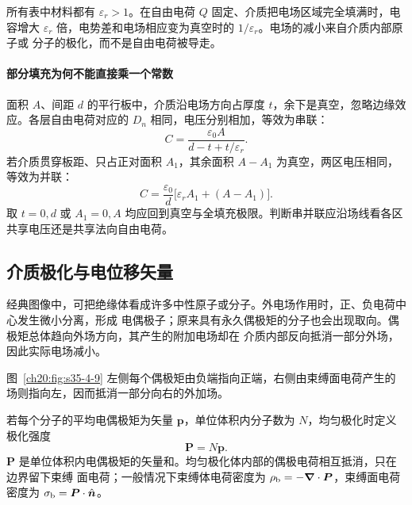 {所有表中材料都有 $\varepsilon_r>1$。在自由电荷 $Q$ 固定、介质把电场区域完全填满时，电容增大
$\varepsilon_r$ 倍，电势差和电场相应变为真空时的 $1/\varepsilon_r$。电场的减小来自介质内部原子或
分子的极化，而不是自由电荷被导走。


\paragraph{部分填充为何不能直接乘一个常数}
面积 $A$、间距 $d$ 的平行板中，介质沿电场方向占厚度 $t$，余下是真空，忽略边缘效应。各层自由电荷对应的 $D_n$ 相同，电压分别相加，等效为串联：
\[
 C=\frac{\varepsilon_0A}{d-t+t/\varepsilon_r}.
\]
若介质贯穿板距、只占正对面积 $A_1$，其余面积 $A-A_1$ 为真空，两区电压相同，等效为并联：
\[
 C=\frac{\varepsilon_0}{d}\bigl[\varepsilon_rA_1+(A-A_1)\bigr].
\]
取 $t=0,d$ 或 $A_1=0,A$ 均应回到真空与全填充极限。判断串并联应沿场线看各区共享电压还是共享法向自由电荷。


\subsection{介质极化与电位移矢量}


经典图像中，可把绝缘体看成许多中性原子或分子。外电场作用时，正、负电荷中心发生微小分离，形成
电偶极子；原来具有永久偶极矩的分子也会出现取向。偶极矩总体趋向外场方向，其产生的附加电场却在
介质内部反向抵消一部分外场，因此实际电场减小。

图~\ref{ch20:fig:s35-4-9} 左侧每个偶极矩由负端指向正端，右侧由束缚面电荷产生的场则指向左，因而抵消一部分向右的外加场。

\par\noindent\begin{minipage}{\linewidth}
\polarizationFigure
{}\label{ch20:fig:s35-4-9}
\end{minipage}\par\medskip

若每个分子的平均电偶极矩为矢量 $\boldsymbol p$，单位体积内分子数为 $N$，均匀极化时定义极化强度
\begin{equation}
  \boxed{\boldsymbol P=N\boldsymbol p}.
\end{equation}
$\boldsymbol P$ 是单位体积内电偶极矩的矢量和。均匀极化体内部的偶极电荷相互抵消，只在边界留下束缚
面电荷；一般情况下束缚体电荷密度为 $\rho_{\rm b}=-\boldsymbol\nabla\cdot\boldsymbol P$，束缚面电荷
密度为 $\sigma_{\rm b}=\boldsymbol P\cdot\hat{\boldsymbol n}$。

}

